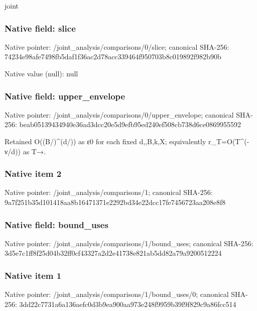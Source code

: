 \documentclass[10pt,a4paper]{article}
\begin{document}
\begingroup\raggedright\sloppy joint\par\endgroup

\subsubsection{Native field: slice}
Native pointer: /joint\_\allowbreak{}analysis/comparisons/0/slice; canonical SHA-256: 74234e98afe7498fb5daf1f36ac2d78acc339464f950703b8c019892f982b90b

Native value (null): null

\subsubsection{Native field: upper\_\allowbreak{}envelope}
Native pointer: /joint\_\allowbreak{}analysis/comparisons/0/upper\_\allowbreak{}envelope; canonical SHA-256: beab05139434940e36ad3dcc20e5d9efb95ed240ef508cb738d6ce0869955592

\begingroup\raggedright\sloppy Retained O((B/\allowbreak{})\textasciicircum{}(d/\allowbreak{})) as {\AtlasUnicodeText ε}\allowbreak{}0 for each fixed d,\allowbreak{},\allowbreak{}B,\allowbreak{}k,\allowbreak{}X;\allowbreak{} equivalently r\_\allowbreak{}T=\allowbreak{}O(T\textasciicircum{}(-{\AtlasUnicodeText ν}\allowbreak{}/\allowbreak{}d)) as T{\AtlasUnicodeSymbols →}\allowbreak{}.\par\endgroup

\subsubsection{Native item 2}
Native pointer: /joint\_\allowbreak{}analysis/comparisons/1; canonical SHA-256: 9a7f251b35d101418aa8b16471371e2292bd34e22dcc17fe7456723aa208e8f8

\subsubsection{Native field: bound\_\allowbreak{}uses}
Native pointer: /joint\_\allowbreak{}analysis/comparisons/1/bound\_\allowbreak{}uses; canonical SHA-256: 3d5e7c1ff8f25d04b32ff0cf43327a2d2e41738e821ab5dd82a79a9200512224

\subsubsection{Native item 1}
Native pointer: /joint\_\allowbreak{}analysis/comparisons/1/bound\_\allowbreak{}uses/0; canonical SHA-256: 3dd22c7731a6a136aefc0d3b9ea900aa973e248f9959b39f9f829c9a86fcc514
\end{document}
